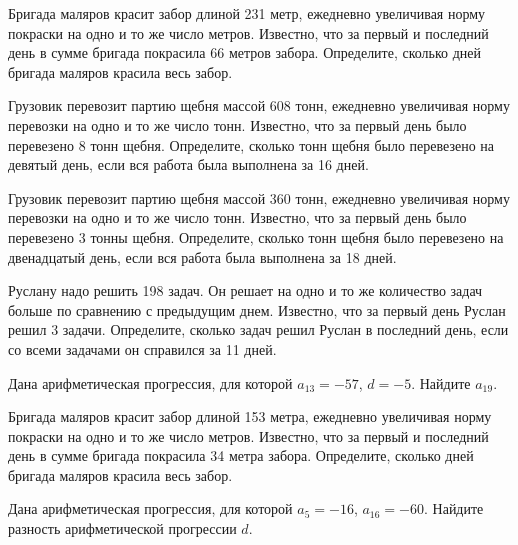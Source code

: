 \documentclass[4apaper]{article}
\begin{document}
\begin{taskBN}{16}
 Бригада маляров красит забор длиной 231 метр, ежедневно увеличивая норму покраски на одно и то же число метров. Известно, что за первый и последний день в сумме бригада покрасила 66 метров забора.  Определите, сколько дней бригада маляров красила весь забор. 
\end{taskBN}

\begin{taskBN}{17}
Грузовик перевозит партию щебня массой 608 тонн, ежедневно увеличивая норму перевозки на одно и то же число тонн. Известно, что за первый день было перевезено 8 тонн щебня. Определите, сколько тонн щебня было перевезено на девятый день, если вся работа была выполнена за 16 дней.
\end{taskBN}

\begin{taskBN}{18}
Грузовик перевозит партию щебня массой 360 тонн, ежедневно увеличивая норму перевозки на одно и то же число тонн. Известно, что за первый день было перевезено 3 тонны щебня. Определите, сколько тонн щебня было перевезено на двенадцатый день, если вся работа была выполнена за 18 дней.
\end{taskBN}

\begin{taskBN}{19}
Руслану надо решить 198 задач. Он решает на одно и то же количество задач больше по сравнению с предыдущим днем. Известно, что за первый день Руслан решил 3 задачи. Определите, сколько задач решил Руслан в последний день, если со всеми задачами он справился за 11 дней.
\end{taskBN}

\begin{taskBN}{20}
Дана арифметическая прогрессия, для которой $a_{13} = -57$, $d=-5$. Найдите $a_{19}$.
\end{taskBN}

\begin{taskBN}{21}
 Бригада маляров красит забор длиной 153 метра, ежедневно увеличивая норму покраски на одно и то же число метров. Известно, что за первый и последний день в сумме бригада покрасила 34 метра забора.  Определите, сколько дней бригада маляров красила весь забор. 
\end{taskBN}

\begin{taskBN}{22}
Дана арифметическая прогрессия, для которой $a_{5} = -16$, $a_{16} = -60$. Найдите разность арифметической прогрессии $d$.
\end{taskBN}
\end{document}
